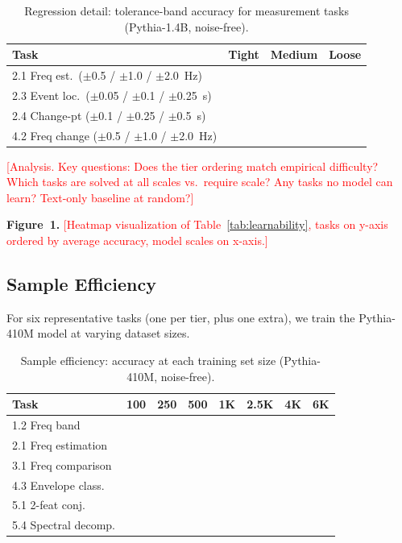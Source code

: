 \documentclass[11pt]{article}
\newcommand{\placeholder}[1]{\textcolor{red}{[#1]}}
\begin{document}
\begin{table}[t]
\centering
\small
\caption{Regression detail: tolerance-band accuracy for measurement tasks (Pythia-1.4B, noise-free).}
\label{tab:regression}
\begin{tabular}{lccc}
\toprule
\textbf{Task} & \textbf{Tight} & \textbf{Medium} & \textbf{Loose} \\
\midrule
2.1 Freq est.\ ($\pm$0.5 / $\pm$1.0 / $\pm$2.0~Hz) &  &  &  \\
2.3 Event loc.\ ($\pm$0.05 / $\pm$0.1 / $\pm$0.25~s) &  &  &  \\
2.4 Change-pt ($\pm$0.1 / $\pm$0.25 / $\pm$0.5~s)    &  &  &  \\
4.2 Freq change ($\pm$0.5 / $\pm$1.0 / $\pm$2.0~Hz)  &  &  &  \\
\bottomrule
\end{tabular}
\end{table}


\placeholder{Analysis. Key questions: Does the tier ordering match empirical difficulty? Which tasks are solved at all scales vs.\ require scale? Any tasks no model can learn? Text-only baseline at random?}

\textbf{Figure~1.} \placeholder{Heatmap visualization of Table~\ref{tab:learnability}, tasks on y-axis ordered by average accuracy, model scales on x-axis.}


\subsection{Sample Efficiency}
\label{sec:efficiency}

For six representative tasks (one per tier, plus one extra), we train the Pythia-410M model at varying dataset sizes.

\begin{table}[t]
\centering
\small
\caption{Sample efficiency: accuracy at each training set size (Pythia-410M, noise-free).}
\label{tab:sample}
\begin{tabular}{lccccccc}
\toprule
\textbf{Task} & \textbf{100} & \textbf{250} & \textbf{500} & \textbf{1K} & \textbf{2.5K} & \textbf{4K} & \textbf{6K} \\
\midrule
1.2 Freq band       &  &  &  &  &  &  &  \\
2.1 Freq estimation  &  &  &  &  &  &  &  \\
3.1 Freq comparison  &  &  &  &  &  &  &  \\
4.3 Envelope class.  &  &  &  &  &  &  &  \\
5.1 2-feat conj.     &  &  &  &  &  &  &  \\
5.4 Spectral decomp. &  &  &  &  &  &  &  \\
\bottomrule
\end{tabular}
\end{table}
\end{document}
